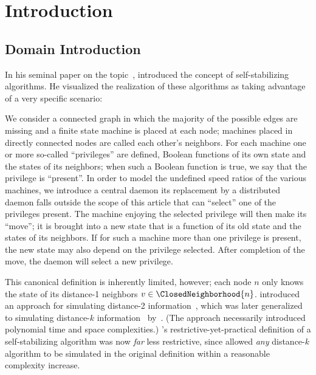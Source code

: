 \section{Introduction}
\label{sec:introduction}
\subsection{Domain Introduction}
In his seminal paper on the topic~\autocite{dew:sem},
  \citeauthor{dew:sem} introduced the concept of
  self-stabilizing algorithms.
He visualized the realization of these algorithms as taking advantage of
  a very specific scenario:
\begin{displayquote}
  We consider a connected graph in which
    the majority of the possible edges are missing and
    a finite state machine is placed at each node;
    machines placed in directly connected nodes are called each other's neighbors.
  For each machine one or more so-called \enquote{privileges} are defined,
    \ie Boolean functions of its own state and the states of its neighbors;
    when such a Boolean function is true,
    we say that the privilege is \enquote{present}.
  In order to model the undefined speed ratios of the various machines,
    we introduce a central daemon \Dash
    its replacement by a distributed daemon falls outside the scope of this article \Dash
    that can \enquote{select} one of the privileges present.
  The machine enjoying the selected privilege will then make its \enquote{move};
    \ie it is brought into a new state that is a function of
    its old state and the states of its neighbors.
  If for such a machine more than one privilege is present,
    the new state may also depend on the privilege selected.
  After completion of the move, the daemon will select a new privilege.
\end{displayquote}
This canonical definition is inherently limited, however;
  each node $n$ only knows the state of its distance-1 neighbors $v \in \ClosedNeighborhood{n}$.
\citeauthor{gairing:distance-2} introduced an approach for
  simulating distance-2 information~\autocite{gairing:distance-2},
  which was later generalized to simulating distance-$k$
  information~\autocite{goddard:ssa--k-distance} by~\citeauthor{goddard:ssa--k-distance}.
  (The approach necessarily introduced polynomial time and space complexities.)
\citeauthor{dew:sem}'s restrictive-yet-practical definition
  of a self-stabilizing algorithm
  was now \emph{far} less restrictive,
  since \citeauthor{goddard:ssa--k-distance} allowed \emph{any} distance-$k$ algorithm
  to be simulated in the original definition within a reasonable complexity increase.

